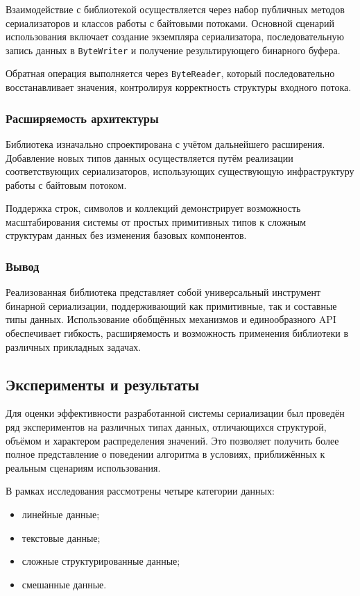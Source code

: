 \documentclass[coursework]{SCWorks}
\begin{document}
Взаимодействие с библиотекой осуществляется через набор публичных методов сериализаторов и классов работы с байтовыми потоками. Основной сценарий использования включает создание экземпляра сериализатора, последовательную запись данных в \texttt{ByteWriter} и получение результирующего бинарного буфера.

Обратная операция выполняется через \texttt{ByteReader}, который последовательно восстанавливает значения, контролируя корректность структуры входного потока.

\subsubsection{Расширяемость архитектуры}

Библиотека изначально спроектирована с учётом дальнейшего расширения. Добавление новых типов данных осуществляется путём реализации соответствующих сериализаторов, использующих существующую инфраструктуру работы с байтовым потоком.

Поддержка строк, символов и коллекций демонстрирует возможность масштабирования системы от простых примитивных типов к сложным структурам данных без изменения базовых компонентов.

\subsubsection{Вывод}

Реализованная библиотека представляет собой универсальный инструмент бинарной сериализации, поддерживающий как примитивные, так и составные типы данных. Использование обобщённых механизмов и единообразного API обеспечивает гибкость, расширяемость и возможность применения библиотеки в различных прикладных задачах.


\subsection{Эксперименты и результаты}

Для оценки эффективности разработанной системы сериализации был проведён ряд экспериментов на различных типах данных, отличающихся структурой, объёмом и характером распределения значений. Это позволяет получить более полное представление о поведении алгоритма в условиях, приближённых к реальным сценариям использования.

В рамках исследования рассмотрены четыре категории данных:
\begin{itemize}
    \item линейные данные;
    \item текстовые данные;
    \item сложные структурированные данные;
    \item смешанные данные.
\end{itemize}
\end{document}
